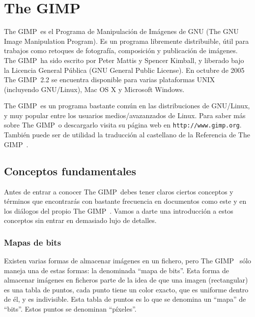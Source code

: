 
\newcommand{\gimp}{{\sf The GIMP}~{}}
\newcommand{\bir}{botón izquierdo del ratón~{}}
\newcommand{\bcr}{botón central del ratón~{}}
\newcommand{\bdr}{botón derecho del ratón~{}}

\chapter{The GIMP}
\label{gimp.tex}
\index{\gimp}

\gimp es el Programa de Manipulación de Imágenes de GNU (The GNU Image
Manipulation Program).  Es un  programa libremente  distribuible, útil
para trabajos  como retoques de fotografía,  composición y publicación
de imágenes. \gimp ha sido escrito por Peter Mattis y Spencer Kimball,
y  liberado  bajo la  Licencia  General  Pública (GNU  General  Public
License). En octubre de 2005 \gimp 2.2 se encuentra disponible para varias
plataformas UNIX (incluyendo GNU/Linux), Mac OS X y Microsoft Windows.


\gimp es un programa bastante común en las distribuciones de
GNU/Linux,  y muy  popular  entre los  usuarios medios/avazanzados  de
Linux. Para saber  más sobre \gimp o descargarlo visita  su página web
en  {\tt http://www.gimp.org}.  También  puede  ser  de  utilidad  la
traducción al castellano de la Referencia de \gimp\cite{gimpref}.

\section{Conceptos fundamentales}


Antes de entrar  a conocer \gimp debes tener  claros ciertos conceptos
y  términos  que encontrarás  con  bastante  frecuencia en  documentos
como  este y  en los  diálogos  del propio  \gimp. Vamos  a darte  una
introducción  a  estos  conceptos  sin entrar  en  demasiado  lujo  de
detalles.

\subsection{Mapas de bits}
\index{\gimp!mapas de bits}

Existen varias formas de almacenar  imágenes en un fichero, pero \gimp
sólo maneja una de estas formas:  la denominada ``mapa de bits''. Esta
forma de  almacenar imágenes en ficheros  parte de la idea  de que una
imagen (rectangular) es una tabla de puntos, cada punto tiene un color
exacto, que es uniforme dentro de  él, y es indivisible. Esta tabla de
puntos es lo que se denomina  un ``mapa'' de ``bits''. Estos puntos se
denominan ``píxeles''.

